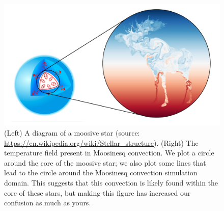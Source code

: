 \begin{figure}[t!]
\centering
    \includegraphics[width=\textwidth]{moosive_stars.pdf}
\caption{
    (Left) A diagram of a moosive star (source: \url{https://en.wikipedia.org/wiki/Stellar_structure}).
    (Right) The temperature field present in Moosinesq convection.
    We plot a circle around the core of the moosive star; we also plot some lines that lead to the circle around the Moosinesq convection simulation domain.
    This suggests that this convection is likely found within the core of these stars, but making this figure has increased our confusion as much as yours.
\label{fig:moosive_stars}
}
\end{figure}


